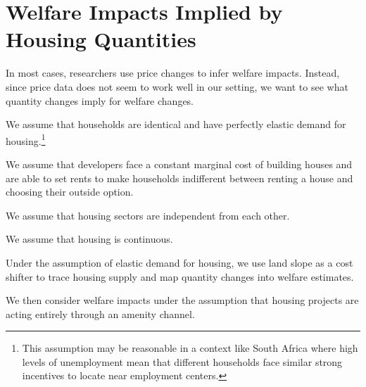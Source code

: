 \documentclass[12pt]{article}
\begin{document}





\section{Welfare Impacts Implied by Housing Quantities}\label{section:theory}





In most cases, researchers use price changes to infer welfare impacts.  Instead, since price data does not seem to work well in our setting, we want to see what quantity changes imply for welfare changes.  

We assume that households are identical and have perfectly elastic demand for housing.\footnote{This assumption may be reasonable in a context like South Africa where high levels of unemployment mean that different households face similar strong incentives to locate near employment centers.}

We assume that developers face a constant marginal cost of building houses and are able to set rents to make households indifferent between renting a house and choosing their outside option.

We assume that housing sectors are independent from each other.

We assume that housing is continuous.

Under the assumption of elastic demand for housing, we use land slope as a cost shifter to trace housing supply and map quantity changes into welfare estimates.

We then consider welfare impacts under the assumption that housing projects are acting entirely through an amenity channel.


\end{document}
